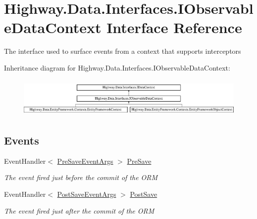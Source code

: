 \hypertarget{interface_highway_1_1_data_1_1_interfaces_1_1_i_observable_data_context}{\section{Highway.\-Data.\-Interfaces.\-I\-Observable\-Data\-Context Interface Reference}
\label{interface_highway_1_1_data_1_1_interfaces_1_1_i_observable_data_context}
}


The interface used to surface events from a context that supports interceptors  


Inheritance diagram for Highway.\-Data.\-Interfaces.\-I\-Observable\-Data\-Context\-:\begin{figure}[H]
\begin{center}
\leavevmode
\includegraphics[height=1.971831cm]{interface_highway_1_1_data_1_1_interfaces_1_1_i_observable_data_context}
\end{center}
\end{figure}
\subsection*{Events}
\begin{DoxyCompactItemize}
\item 
Event\-Handler$<$ \hyperlink{class_highway_1_1_data_1_1_interceptors_1_1_events_1_1_pre_save_event_args}{Pre\-Save\-Event\-Args} $>$ \hyperlink{interface_highway_1_1_data_1_1_interfaces_1_1_i_observable_data_context_add85ecbc05ebf7174003841bdbd72dfe}{Pre\-Save}
\begin{DoxyCompactList}\small\item\em The event fired just before the commit of the O\-R\-M \end{DoxyCompactList}\item 
Event\-Handler$<$ \hyperlink{class_highway_1_1_data_1_1_interceptors_1_1_events_1_1_post_save_event_args}{Post\-Save\-Event\-Args} $>$ \hyperlink{interface_highway_1_1_data_1_1_interfaces_1_1_i_observable_data_context_a1978b914f7b94a37a6e86f3314326ca9}{Post\-Save}
\begin{DoxyCompactList}\small\item\em The event fired just after the commit of the O\-R\-M \end{DoxyCompactList}\end{DoxyCompactItemize}
